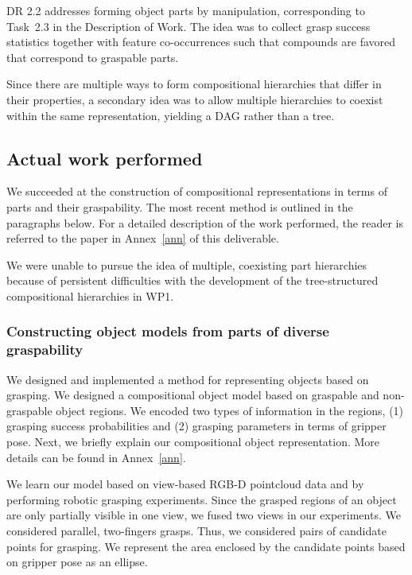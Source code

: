 \documentclass[a4paper,11pt,pdf]{pacmanreport}
\begin{document}

DR 2.2 addresses forming object parts by manipulation, corresponding
to Task~2.3 in the Description of Work.  The idea was to collect grasp
success statistics together with feature co-occurrences such that
compounds are favored that correspond to graspable parts.

Since there are multiple ways to form compositional hierarchies that
differ in their properties, a secondary idea was to allow multiple
hierarchies to coexist within the same representation, yielding a DAG
rather than a tree.


\subsection{Actual work performed}


We succeeded at the construction of compositional representations in
terms of parts and their graspability.  The most recent method is
outlined in the paragraphs below.  For a detailed description of the
work performed, the reader is referred to the paper in Annex~\ref{ann}
of this deliverable.

We were unable to pursue the idea of multiple, coexisting part
hierarchies because of persistent difficulties with the development of
the tree-structured compositional hierarchies in WP1.


\subsubsection{Constructing object models from parts of diverse graspability}

We designed and implemented a method for representing objects based on
grasping. We designed a compositional object model based on graspable
and non-graspable object regions. We encoded two types of information
in the regions, (1) grasping success probabilities and (2) grasping
parameters in terms of gripper pose. Next, we brief\-ly explain our
compositional object representation. More details can be found in
Annex~\ref{ann}.

We learn our model based on view-based RGB-D pointcloud data and by
performing robotic grasping experiments. Since the grasped regions of
an object are only partially visible in one view, we fused two views
in our experiments. We considered parallel, two-fingers grasps. Thus,
we considered pairs of candidate points for grasping. We represent the
area enclosed by the candidate points based on gripper pose as an
ellipse.
\end{document}
